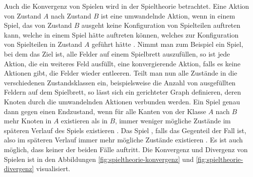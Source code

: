 Auch die Konvergenz von Spielen wird in der Spieltheorie betrachtet. Eine Aktion von Zustand $A$ nach Zustand $B$ ist eine umwandelnde Aktion, wenn in einem Spiel, das von Zustand $B$ ausgeht keine Konfiguration von Spielteilen auftreten kann, welche in einem Spiel hätte auftreten können, welches zur Konfiguration von Spielteilen in Zustand $A$ geführt hätte \cite[S. 157]{1194.SearchAndAiInGames}. Nimmt man zum Beispiel ein Spiel, bei dem das Ziel ist, alle Felder auf einem Spielbrett auszufüllen, so ist jede Aktion, die ein weiteres Feld ausfüllt, eine konvergierende Aktion, falls es keine Aktionen gibt, die Felder wieder entleeren. Teilt man nun alle Zustände in die verschiedenen Zustandsklassen ein, beispielsweise die Anzahl von ausgefüllten Feldern auf dem Spielbrett, so lässt sich ein gerichteter Graph definieren, deren Knoten durch die umwandelnden Aktionen verbunden werden. Ein Spiel  genau dann gegen einen Endzustand, wenn für alle Kanten von der Klasse $A$ nach $B$ mehr Knoten in $A$ existieren als in $B$, \dash immer weniger mögliche Zustände im späteren Verlauf des Spiels existieren \cite[S. 157]{1194.SearchAndAiInGames}. Das Spiel , falls das Gegenteil der Fall ist, also im späteren Verlauf immer mehr mögliche Zustände existieren \cite[S. 157]{1194.SearchAndAiInGames}. Es ist auch möglich, dass keiner der beiden Fälle auftritt. Die Konvergenz und Divergenz von Spielen ist in den Abbildungen \ref{fig:spieltheorie-konvergenz} und \ref{fig:spieltheorie-divergenz} visualisiert.

